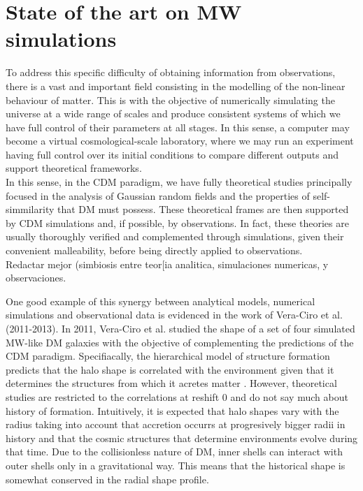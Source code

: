 \section{State of the art on MW simulations}
To address this specific difficulty of obtaining information from observations, there is a vast and important field consisting in the modelling of the non-linear behaviour of matter. 
This is with the objective of numerically simulating the universe at a wide range of scales and produce consistent systems of which we have  full control of their parameters at all stages. 
In this sense, a computer may become a virtual cosmological-scale laboratory, where we may run an experiment having full control over its initial conditions to compare different outputs and support theoretical frameworks. \\

In this sense, in the CDM paradigm, we have fully theoretical studies \cite{Bardeen et al. 1986,Schechter} principally focused in the analysis of Gaussian random fields and the properties of self-simmilarity that DM must possess. 
These theoretical frames are then supported by CDM simulations \cite{Cualquier estudio de CDM hace referencia a esos pilares} and, if possible, by observations. 
In fact, these theories are usually thoroughly verified and complemented through simulations, given their convenient malleability, before being directly applied to observations.\\ Redactar mejor (simbiosis entre teor[ia analitica, simulaciones numericas, y observaciones.

One good example of this synergy between analytical models, numerical simulations and observational data is evidenced in the work of Vera-Ciro et al. (2011-2013). In 2011, Vera-Ciro et al. studied the shape of a set of four simulated MW-like DM galaxies with the objective of complementing the predictions of the CDM paradigm. Specifiacally, the hierarchical model of structure formation predicts that the halo shape is correlated with the environment given that it determines the structures from which it acretes matter \cite{referencias sobre relacion entre forma y entorno}. However, theoretical studies are restricted to the correlations at reshift 0 and do not say much about history of formation. Intuitively, it is expected that halo shapes vary with the radius taking into account that accretion occurrs at progresively bigger radii in history and that the cosmic structures that determine environments evolve during that time. Due to the collisionless nature of DM, inner shells can interact with outer shells only in a gravitational way. This means that the historical shape is somewhat conserved in the radial shape profile.\\

